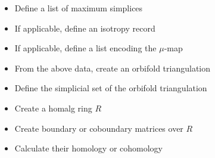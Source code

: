 \documentclass[a4paper,11pt]{report}
\begin{document}
{{ 
\begin{itemize}
\item Define a list of maximum simplices
\item If applicable, define an isotropy record
\item If applicable, define a list encoding the $\mu$-map
\item From the above data, create an orbifold triangulation
\item Define the simplicial set of the orbifold triangulation
\item Create a \textsf{homalg} ring $R$
\item Create boundary or coboundary matrices over $R$
\item Calculate their homology or cohomology
\end{itemize}
 }

 }

   
\end{document}
